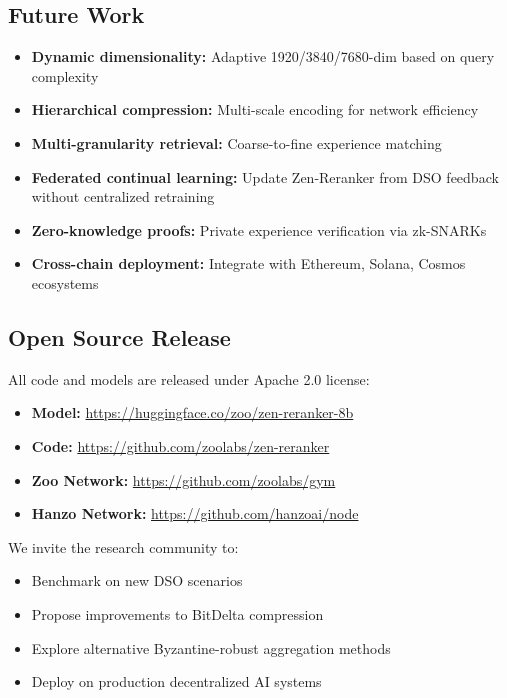 \documentclass[11pt,a4paper]{article}
\begin{document}
\subsection{Future Work}

\begin{itemize}
\item \textbf{Dynamic dimensionality:} Adaptive 1920/3840/7680-dim based on query complexity
\item \textbf{Hierarchical compression:} Multi-scale encoding for network efficiency
\item \textbf{Multi-granularity retrieval:} Coarse-to-fine experience matching
\item \textbf{Federated continual learning:} Update Zen-Reranker from DSO feedback without centralized retraining
\item \textbf{Zero-knowledge proofs:} Private experience verification via zk-SNARKs
\item \textbf{Cross-chain deployment:} Integrate with Ethereum, Solana, Cosmos ecosystems
\end{itemize}

\subsection{Open Source Release}

All code and models are released under Apache 2.0 license:

\begin{itemize}
\item \textbf{Model:} \url{https://huggingface.co/zoo/zen-reranker-8b}
\item \textbf{Code:} \url{https://github.com/zoolabs/zen-reranker}
\item \textbf{Zoo Network:} \url{https://github.com/zoolabs/gym}
\item \textbf{Hanzo Network:} \url{https://github.com/hanzoai/node}
\end{itemize}

We invite the research community to:
\begin{itemize}
\item Benchmark on new DSO scenarios
\item Propose improvements to BitDelta compression
\item Explore alternative Byzantine-robust aggregation methods
\item Deploy on production decentralized AI systems
\end{itemize}
\end{document}
